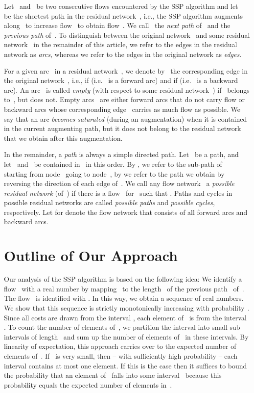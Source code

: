 \documentclass[11pt]{article}
\begin{document}
Let~ and~ be two consecutive flows encountered by the SSP algorithm and let~ be the shortest path in the residual network~, i.e., the SSP algorithm augments along~ to increase flow~ to obtain
flow~. We call~ the \emph{next path} of~ and the \emph{previous path} of~. To distinguish between the original network~ and some residual network~ in the remainder of this article, we refer to the edges in the residual network
as \emph{arcs}, whereas we refer to the edges in the original network
as \emph{edges}.

For a given arc~ in a residual network~, we denote by~ the corresponding edge in the original network~, i.e.,  if  (i.e.~ is a forward arc) and  if  (i.e.~ is a backward arc). An arc~ is called \emph{empty} (with respect to some residual network~) if~ belongs to~, but  does not. Empty arcs~ are either forward arcs that do not carry flow or backward arcs whose corresponding edge~ carries as much flow as possible. We say that an arc \emph{becomes saturated} (during an augmentation) when it is contained in the current augmenting path, but it does not belong to the residual network that we obtain after this augmentation.

In the remainder, a \emph{path} is always a simple directed path.
Let~ be a path, and let~ and~ be contained in~ in this order. By , we refer to the sub-path of~ starting from node~ going to node~, by  we refer to the path we obtain by reversing the direction of each edge of~. We call any flow network~ a \emph{possible residual network} (of~) if there is a flow~ for~ such that . Paths and cycles in possible residual networks are called \emph{possible paths} and \emph{possible cycles}, respectively. Let  for  denote the flow network that consists of all forward arcs and backward arcs. 

\section{Outline of Our Approach}

Our analysis of the SSP algorithm is based on the following idea: We identify a flow~ with a real number by mapping~ to the length~ of the previous path~ of~. The flow~ is identified with . In this way,
we obtain a sequence  of real numbers. We show that this sequence is strictly monotonically increasing with probability~. Since all costs are drawn from the interval , each element of~ is from the interval . To count the number of elements of~, we partition the interval  into small sub-intervals of length~ and sum up the number of elements of~ in these intervals. By linearity of expectation, this approach carries over to the expected number of elements of~. If~ is very small, then -- with sufficiently high probability -- each interval contains at most one element. 
If this is the case then it suffices to bound the probability that an element of~ falls into some interval~ because
this probability equals the expected number of elements in~.
\end{document}
